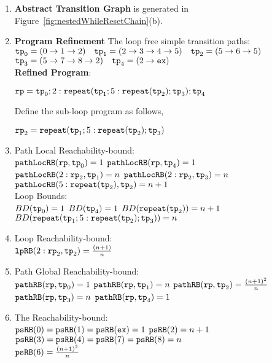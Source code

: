 \begin{enumerate}
  \item  \textbf{Abstract Transition Graph} is generated in Figure~\ref{fig:nestedWhileResetChain}(b).

  \item \textbf{Program Refinement}
  The loop free simple transition paths:
  \\
          $\mathtt{tp}_0 = (0 \to 1 \to 2)
          \quad
          \mathtt{tp}_1 = (2 \to 3 \to 4 \to 5)
          \quad           
          \mathtt{tp}_2 = (5 \to 6 \to 5)
          $
          \\
          $
          \mathtt{tp}_3 = (5 \to 7 \to 8 \to 2)
          \quad
          \mathtt{tp}_4 = (2 \to \mathtt{ex})
          $
          \\
  \textbf{Refined Program}:

  $\mathtt{rp} = \mathtt{tp}_0 ; 2: \mathtt{repeat}(\mathtt{tp}_1; 5: \mathtt{repeat}(\mathtt{tp}_2); \mathtt{tp}_3); \mathtt{tp}_4$

Define the sub-loop program as follows,

$\mathtt{rp}_2 = \mathtt{repeat}(\mathtt{tp}_1; 5: \mathtt{repeat}(\mathtt{tp}_2); \mathtt{tp}_3)$
\item {Path Local Reachability-bound}:
\\
$\mathtt{pathLocRB}(\mathtt{rp}, \mathtt{tp}_0) = 1$ \quad
$\mathtt{pathLocRB}(\mathtt{rp}, \mathtt{tp}_4) = 1$ \\
$\mathtt{pathLocRB}(2: \mathtt{rp}_2, \mathtt{tp}_1) = n$ \quad
$\mathtt{pathLocRB}(2: \mathtt{rp}_2, \mathtt{tp}_3) = n$ \\
$\mathtt{pathLocRB}(5: \mathtt{repeat}(\mathtt{tp}_2), \mathtt{tp}_2) = n + 1$
%
\\
Loop Bounds:
\\
$BD(\mathtt{tp}_0) = 1$
\quad
$BD(\mathtt{tp}_4) = 1$
\quad
$BD(\mathtt{repeat}(\mathtt{tp}_2)) = n + 1 $
\\
$BD(\mathtt{repeat}(\mathtt{tp}_1; 5: \mathtt{repeat}(\mathtt{tp}_2); \mathtt{tp}_3)) = n $
%
\item Loop Reachability-bound:
\\
$\mathtt{lpRB}(2: \mathtt{rp}_2, \mathtt{tp}_2) = \frac{(n + 1)}{n}$ 
%
%
\item Path Global Reachability-bound:
\\
$\mathtt{pathRB}(\mathtt{rp}, \mathtt{tp}_0) = 1$ \quad
$\mathtt{pathRB}(\mathtt{rp}, \mathtt{tp}_1) = n$ \quad
$\mathtt{pathRB}(\mathtt{rp}, \mathtt{tp}_2) = \frac{(n + 1)^2}{n}$ \\
$\mathtt{pathRB}(\mathtt{rp}, \mathtt{tp}_3) = n$ \quad
$\mathtt{pathRB}(\mathtt{rp}, \mathtt{tp}_4) = 1$
%
\item The Reachability-bound:
\\
$\mathtt{psRB}(0) = \mathtt{psRB}(1) = \mathtt{psRB}(\mathtt{ex}) = 1$ \quad
$\mathtt{psRB}(2) = n + 1$ \\
$\mathtt{psRB}(3) = \mathtt{psRB}(4) =\mathtt{psRB}(7) = \mathtt{psRB}(8) = n$ \quad \\
$\mathtt{psRB}(6) = \frac{(n + 1)^2}{n} $ \quad
{}
\end{enumerate}